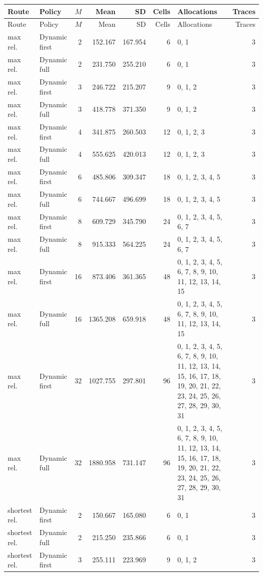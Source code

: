 \documentclass[10pt,a4paper]{article}
\begin{document}
\tiny\setlength{\tabcolsep}{2pt}\begin{longtable}{@{}p{23mm}p{29mm}rrrrp{36mm}r@{}}
\toprule Route & Policy & $M$ & Mean & SD & Cells & Allocations & Traces \\ \midrule\endfirsthead
\toprule Route & Policy & $M$ & Mean & SD & Cells & Allocations & Traces \\ \midrule\endhead
\bottomrule\endfoot
max rel. & Dynamic first & 2 & 152.167 & 167.954 & 6 & 0, 1 & 3 \\
max rel. & Dynamic full & 2 & 231.750 & 255.210 & 6 & 0, 1 & 3 \\
max rel. & Dynamic first & 3 & 246.722 & 215.207 & 9 & 0, 1, 2 & 3 \\
max rel. & Dynamic full & 3 & 418.778 & 371.350 & 9 & 0, 1, 2 & 3 \\
max rel. & Dynamic first & 4 & 341.875 & 260.503 & 12 & 0, 1, 2, 3 & 3 \\
max rel. & Dynamic full & 4 & 555.625 & 420.013 & 12 & 0, 1, 2, 3 & 3 \\
max rel. & Dynamic first & 6 & 485.806 & 309.347 & 18 & 0, 1, 2, 3, 4, 5 & 3 \\
max rel. & Dynamic full & 6 & 744.667 & 496.699 & 18 & 0, 1, 2, 3, 4, 5 & 3 \\
max rel. & Dynamic first & 8 & 609.729 & 345.790 & 24 & 0, 1, 2, 3, 4, 5, 6, 7 & 3 \\
max rel. & Dynamic full & 8 & 915.333 & 564.225 & 24 & 0, 1, 2, 3, 4, 5, 6, 7 & 3 \\
max rel. & Dynamic first & 16 & 873.406 & 361.365 & 48 & 0, 1, 2, 3, 4, 5, 6, 7, 8, 9, 10, 11, 12, 13, 14, 15 & 3 \\
max rel. & Dynamic full & 16 & 1365.208 & 659.918 & 48 & 0, 1, 2, 3, 4, 5, 6, 7, 8, 9, 10, 11, 12, 13, 14, 15 & 3 \\
max rel. & Dynamic first & 32 & 1027.755 & 297.801 & 96 & 0, 1, 2, 3, 4, 5, 6, 7, 8, 9, 10, 11, 12, 13, 14, 15, 16, 17, 18, 19, 20, 21, 22, 23, 24, 25, 26, 27, 28, 29, 30, 31 & 3 \\
max rel. & Dynamic full & 32 & 1880.958 & 731.147 & 96 & 0, 1, 2, 3, 4, 5, 6, 7, 8, 9, 10, 11, 12, 13, 14, 15, 16, 17, 18, 19, 20, 21, 22, 23, 24, 25, 26, 27, 28, 29, 30, 31 & 3 \\
shortest rel. & Dynamic first & 2 & 150.667 & 165.080 & 6 & 0, 1 & 3 \\
shortest rel. & Dynamic full & 2 & 215.250 & 235.866 & 6 & 0, 1 & 3 \\
shortest rel. & Dynamic first & 3 & 255.111 & 223.969 & 9 & 0, 1, 2 & 3 \\

\end{longtable}
\end{document}
